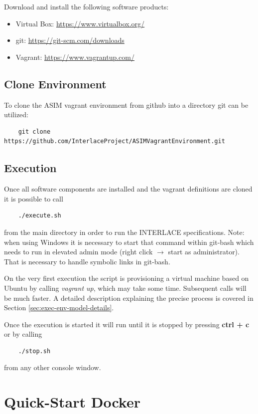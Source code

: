 Download and install the following software products:
\begin{itemize}
	\item Virtual Box: \url{https://www.virtualbox.org/}
	\item git: \url{https://git-scm.com/downloads}
	\item Vagrant: \url{https://www.vagrantup.com/}
\end{itemize}

\subsection{Clone Environment}

To clone the ASIM vagrant environment from github into a directory git can be utilized:
\begin{lstlisting}
	git clone https://github.com/InterlaceProject/ASIMVagrantEnvironment.git
\end{lstlisting}

\subsection{Execution}

Once all software components are installed and the vagrant definitions are cloned it is possible to call
\begin{lstlisting}
	./execute.sh
\end{lstlisting}
from the main directory in order to run the INTERLACE specifications. Note: when using Windows it is necessary to start that command within git-bash which needs to run in elevated admin mode (right click $\rightarrow$ start as administrator). That is necessary to handle symbolic links in git-bash.

On the very first execution the script is provisioning a virtual machine based on Ubuntu by calling \textit{vagrant up}, which may take some time. Subsequent calls will be much faster. A detailed description explaining the precise process is covered in Section \ref{sec:exec-env-model-details}.

Once the execution is started it will run until it is stopped by pressing \textbf{ctrl + c} or by calling
\begin{lstlisting}
	./stop.sh
\end{lstlisting}
from any other console window.

\section{Quick-Start Docker}
\label{sec:quick-start-docker}


